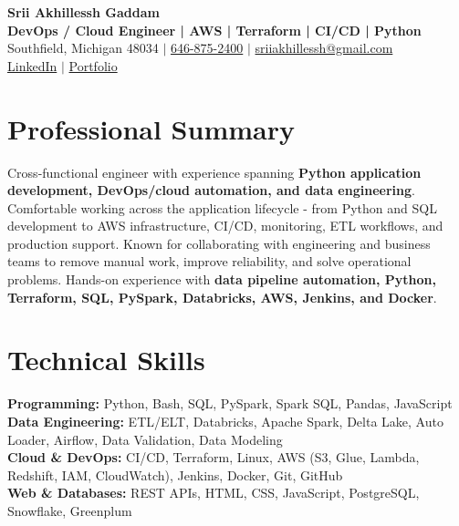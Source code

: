 \documentclass[letterpaper,10pt]{article}
\begin{document}
\fontsize{9.35pt}{10.45pt}\selectfont

\begin{center}
    {\LARGE \textbf{Srii Akhillessh Gaddam}} \\[-1pt]
    \textbf{DevOps / Cloud Engineer | AWS | Terraform | CI/CD | Python} \\[2pt]
    Southfield, Michigan 48034 $|$
    \href{tel:6468752400}{646-875-2400} $|$
    \href{mailto:sriiakhillessh@gmail.com}{sriiakhillessh@gmail.com} \\[1pt]
    \href{https://www.linkedin.com/in/srii-akhiilessh-gaddam-b48668191/}{LinkedIn} $|$
    \href{https://sriiakhillesshg.github.io/portfolio/}{Portfolio}
\end{center}
\vspace{-8pt}

\section{Professional Summary}
\small{Cross-functional engineer with experience spanning \textbf{Python application development, DevOps/cloud automation, and data engineering}. Comfortable working across the application lifecycle - from Python and SQL development to AWS infrastructure, CI/CD, monitoring, ETL workflows, and production support. Known for collaborating with engineering and business teams to remove manual work, improve reliability, and solve operational problems. Hands-on experience with \textbf{data pipeline automation, Python, Terraform, SQL, PySpark, Databricks, AWS, Jenkins, and Docker}.}

\section{Technical Skills}
\small{
\textbf{Programming:} Python, Bash, SQL, PySpark, Spark SQL, Pandas, JavaScript \\
\textbf{Data Engineering:} ETL/ELT, Databricks, Apache Spark, Delta Lake, Auto Loader, Airflow, Data Validation, Data Modeling \\
\textbf{Cloud \& DevOps:} CI/CD, Terraform, Linux, AWS (S3, Glue, Lambda, Redshift, IAM, CloudWatch), Jenkins, Docker, Git, GitHub \\
\textbf{Web \& Databases:} REST APIs, HTML, CSS, JavaScript, PostgreSQL, Snowflake, Greenplum
}
\end{document}
